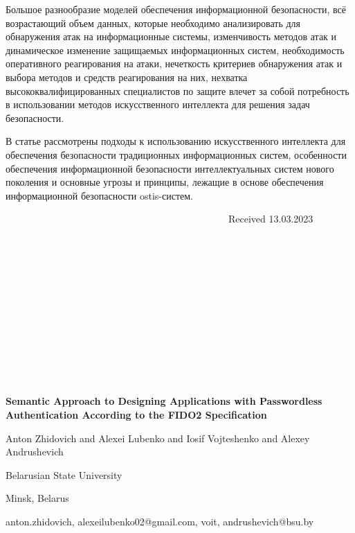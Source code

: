 \documentclass{article}
\begin{document}
\begin{multicols}{2}
\begin{center}
 \end{center}
Большое разнообразие моделей обеспечения информационной безопасности, всё возрастающий объем
данных, которые необходимо анализировать для обнаружения атак на информационные системы, изменчивость
методов атак и динамическое изменение защищаемых
информационных систем, необходимость оперативного
реагирования на атаки, нечеткость критериев обнаружения атак и выбора методов и средств реагирования
на них, нехватка высококвалифицированных специалистов по защите влечет за собой потребность в
использовании методов искусственного интеллекта для
решения задач безопасности.
\par
В статье рассмотрены подходы к использованию
искусственного интеллекта для обеспечения безопасности традиционных информационных систем, особенности обеспечения информационной безопасности
интеллектуальных систем нового поколения и основные
угрозы и принципы, лежащие в основе обеспечения
информационной безопасности ostis-систем.


\ \ \ \ \ \ \ \ \ \ \ \ \ \ \ \ \ \ \ \ \ \ \ \ \ \ \ \ \ \ \ \ \ \ \ \ \ \ \ \ \ \ \ \ \ \ Received 13.03.2023 \ \\ \ \\ \ \\ \ \\ \ \\ \ \\ \ \\ \ \\ \ \\ \ \\ \ \\ 
\end{multicols}
\newpage
\ \\
\begin{center}
\LARGE\textbf{Semantic Approach to Designing Applications
with Passwordless Authentication According to
the FIDO2 Specification}
\large
\par
Anton Zhidovich and Alexei Lubenko and Iosif Vojteshenko and Alexey Andrushevich
\par
Belarusian State University
\par
Minsk, Belarus
\par
{anton.zhidovich, alexeilubenko02}@gmail.com, {voit, andrushevich}@bsu.by
\end{center}\ \\  
\end{document}
